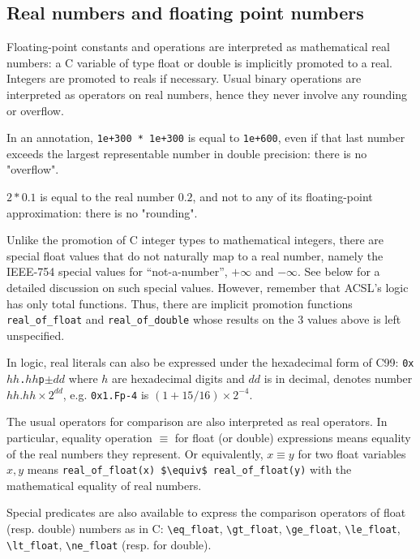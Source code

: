 \subsection{Real numbers and floating point numbers}
\label{sec:floating-point}

Floating-point constants and operations are interpreted as
mathematical real numbers: a C variable of type float or double is
implicitly promoted to a real. Integers are promoted to reals if
necessary. Usual binary operations are interpreted as operators on
real numbers, hence they never involve any rounding or overflow.

\begin{example}
  In an annotation, \lstinline|1e+300 * 1e+300| is equal to
  \lstinline|1e+600|, even if that last number exceeds the largest
  representable number in double precision: there is no "overflow".

  $2 * 0.1$ is equal to the real number $0.2$, and not to any of its
  floating-point approximation: there is no "rounding".
\end{example}
Unlike the promotion of C integer types to mathematical integers,
there are special float values that do not naturally map to a real
number, namely the IEEE-754 special values for ``not-a-number'',
$+\infty$ and $-\infty$. See below for a detailed discussion on such
special values. However, remember that ACSL's logic has only total
functions. Thus, there are implicit promotion functions
\lstinline|real_of_float| and
\lstinline|real_of_double| whose results on
the 3 values above is left unspecified.

In logic, real literals can also be expressed under the hexadecimal
form of C99: \texttt{0x$hh$.$hh$p$\pm{}dd$} where $h$ are hexadecimal
digits and $dd$ is in decimal, denotes number $hh.hh\times
2^{dd}$, e.g. \texttt{0x1.Fp-4} is $(1+15/16)\times 2^{-4}$.


The usual operators for comparison are also interpreted as real operators. 
In particular, equality operation $\equiv$ for float (or double)
expressions means equality of the real numbers they represent. Or equivalently, $x \equiv y$ for two float
variables $x,y$ means \lstinline|real_of_float(x) $\equiv$ real_of_float(y)|
with the mathematical equality of real
numbers.


Special predicates are also available to express the comparison
operators of float (resp. double) numbers as in C:
\lstinline|\eq_float|,
\lstinline|\gt_float|,
\lstinline|\ge_float|,
\lstinline|\le_float|,
\lstinline|\lt_float|,
\lstinline|\ne_float|
(resp. for double).



